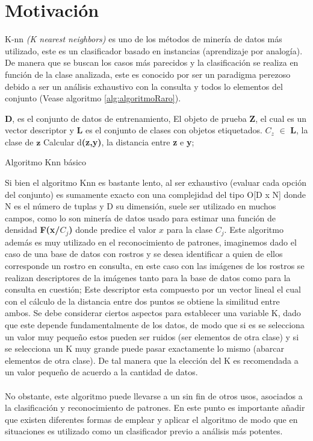 \section{Motivación}

K-nn \textit{(K nearest neighbors)} es uno de los métodos de minería de datos más utilizado, este es un clasificador basado en instancias (aprendizaje por analogía). De manera que se buscan los casos más parecidos y la clasificación se realiza en función de la clase analizada, este es conocido por ser un paradigma perezoso debido a ser un análisis exhaustivo con la consulta y todos lo elementos del conjunto (Vease algoritmo \ref{alg:algoritmoRaro}).\\
\label{alg:algoritmoRaro}
\begin{algorithm}
\begin{algorithmic}[1]
\REQUIRE \textbf{D}, es el conjunto de datos de entrenamiento, El objeto de prueba \textbf{Z}, el cual es un vector descriptor y \textbf{L} es el conjunto de clases con objetos etiquetados.
\ENSURE$ C_z$ $\in$ $\textbf{L}$, la clase de $\textbf{z}$
\STATE Calcular d\textbf{(z,y)}, la distancia entre \textbf{z} e \textbf{y};
\ENDFOR
\end{algorithmic}
\caption{Algoritmo Knn básico}\label{alg:algoritmoRaro}
\end{algorithm}

Si bien el algoritmo Knn es bastante lento, al ser exhaustivo (evaluar cada opción del conjunto) es sumamente exacto con una complejidad del tipo O[D x N] donde N es el número de tuplas y D su dimensión, suele ser utilizado en muchos campos, como lo son minería de datos usado para estimar una función de densidad \textbf{F(x/$C_j$)} donde predice el valor $x$ para la clase $C_j$. Este algoritmo además es muy utilizado en el reconocimiento de patrones, imaginemos dado el caso de una base de datos con rostros y se desea identificar a quien de ellos corresponde un rostro en consulta, en este caso con las imágenes de los rostros se realizan descriptores de la imágenes tanto para la base de datos como para la consulta en cuestión; Este descriptor esta compuesto por un vector lineal el cual con el cálculo de la distancia entre dos puntos se obtiene la similitud entre ambos. Se debe considerar ciertos aspectos para establecer una variable K, dado que este depende fundamentalmente de los datos, de modo que si es se selecciona un valor muy pequeño estos pueden ser ruidos (ser elementos de otra clase) y si se selecciona un K muy grande puede pasar exactamente lo mismo (abarcar elementos de otra clase). De tal manera que la elección del K es recomendada a un valor pequeño de acuerdo a la cantidad de datos.\\
\\
No obstante, este algoritmo puede llevarse a un sin fin de otros usos, asociados a la clasificación y reconocimiento de patrones. En este punto es importante añadir que existen diferentes formas de emplear y aplicar el algoritmo de modo que en situaciones es utilizado como un clasificador previo a análisis más potentes.   

